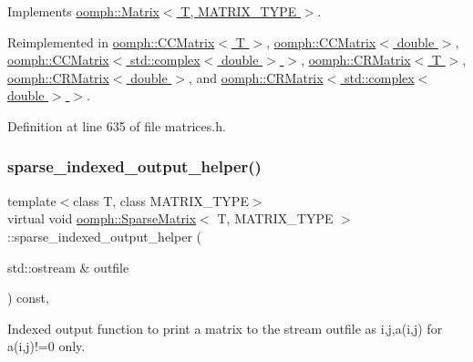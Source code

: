 Implements \hyperlink{classoomph_1_1Matrix_a10ee338f4d3893010291a692aea04248}{oomph\+::\+Matrix$<$ T, M\+A\+T\+R\+I\+X\+\_\+\+T\+Y\+P\+E $>$}.



Reimplemented in \hyperlink{classoomph_1_1CCMatrix_ac3b138b2ed470866999f2a92f3e1f239}{oomph\+::\+C\+C\+Matrix$<$ T $>$}, \hyperlink{classoomph_1_1CCMatrix_ac3b138b2ed470866999f2a92f3e1f239}{oomph\+::\+C\+C\+Matrix$<$ double $>$}, \hyperlink{classoomph_1_1CCMatrix_ac3b138b2ed470866999f2a92f3e1f239}{oomph\+::\+C\+C\+Matrix$<$ std\+::complex$<$ double $>$ $>$}, \hyperlink{classoomph_1_1CRMatrix_abf764862746afbbe2655a41bdf726327}{oomph\+::\+C\+R\+Matrix$<$ T $>$}, \hyperlink{classoomph_1_1CRMatrix_abf764862746afbbe2655a41bdf726327}{oomph\+::\+C\+R\+Matrix$<$ double $>$}, and \hyperlink{classoomph_1_1CRMatrix_abf764862746afbbe2655a41bdf726327}{oomph\+::\+C\+R\+Matrix$<$ std\+::complex$<$ double $>$ $>$}.



Definition at line 635 of file matrices.\+h.

\mbox{\label{classoomph_1_1SparseMatrix_a84a08f7e77be50af6a5655cbe0609619}} 
\subsubsection{\texorpdfstring{sparse\+\_\+indexed\+\_\+output\+\_\+helper()}{sparse\_indexed\_output\_helper()}}
{\footnotesize\ttfamily template$<$class T, class M\+A\+T\+R\+I\+X\+\_\+\+T\+Y\+PE$>$ \\
virtual void \hyperlink{classoomph_1_1SparseMatrix}{oomph\+::\+Sparse\+Matrix}$<$ T, M\+A\+T\+R\+I\+X\+\_\+\+T\+Y\+PE $>$\+::sparse\+\_\+indexed\+\_\+output\+\_\+helper (\begin{DoxyParamCaption}\item[{std\+::ostream \&}]{outfile }\end{DoxyParamCaption}) const\hspace{0.3cm}{\ttfamily [inline]}, {\ttfamily [virtual]}}



Indexed output function to print a matrix to the stream outfile as i,j,a(i,j) for a(i,j)!=0 only. 




